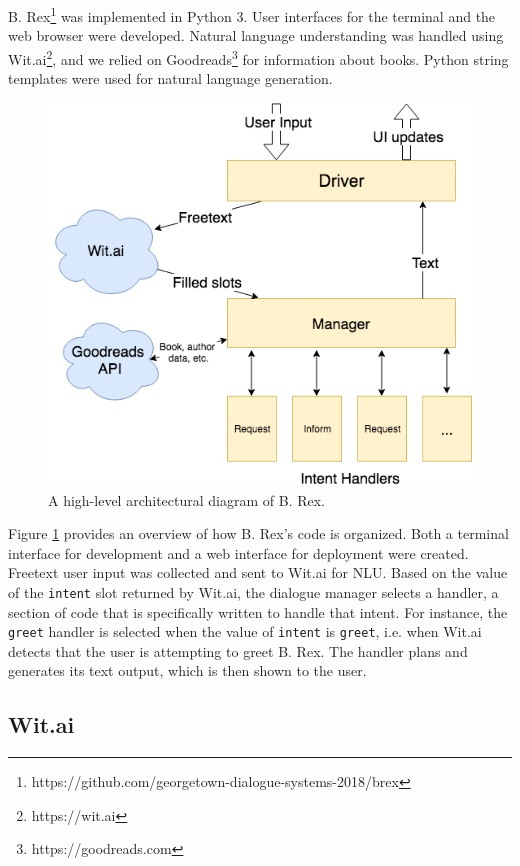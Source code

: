 \documentclass[11pt,a4paper]{article}
\begin{document}
B. Rex\footnote{{https://github.com/georgetown-dialogue-systems-2018/brex}} was implemented in Python 3. User interfaces for the terminal and the web browser were developed. Natural language understanding was handled using Wit.ai\footnote{{https://wit.ai}}, and we relied on Goodreads\footnote{{https://goodreads.com}} for information about books. Python string templates were used for natural language generation.

\begin{figure}
    \centering
    \includegraphics[scale=0.35]{architecture.jpg}
    \caption{A high-level architectural diagram of B. Rex.}
    \label{fig:arch}
\end{figure}

Figure \ref{fig:arch} provides an overview of how B. Rex's code is organized. Both a terminal interface for development and a web interface for deployment were created. Freetext user input was collected and sent to Wit.ai for NLU. Based on the value of the {\tt intent} slot returned by Wit.ai, the dialogue manager selects a handler, a section of code that is specifically written to handle that intent. For instance, the {\tt greet} handler is selected when the value of {\tt intent} is {\tt greet}, i.e. when Wit.ai detects that the user is attempting to greet B. Rex. The handler plans and generates its text output, which is then shown to the user.

\subsection{Wit.ai}\label{sec:witai}
\end{document}
